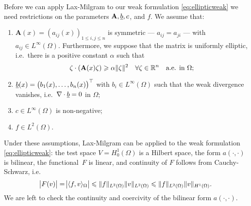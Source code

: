 \documentclass[thesis.tex]{subfiles}
\begin{document}
Before we can apply  Lax-Milgram to our weak formulation \eqref{eq:ellipticweak} we need restrictions on the parameters $\mathbf{A}, \underline{b}, c$, and $f$. We assume that:
\begin{enumerate}[label=(\alph*)]
  \item $\mathbf{A}(x) = (a_{ij}(x))_{1 \leq i,j \leq n}$ is symmetric --- $a_{ij} = a_{ji}$ --- with $a_{ij} \in L^{\infty}(\Omega)$. Furthermore, we suppose that the matrix is uniformly elliptic, i.e.~there is a positive constant $\alpha$ such that 
\[
  \zeta \cdot (\mathbf{A}(x) \zeta) \geqslant \alpha \|\zeta\|^2 \quad \forall \zeta \in \mathbb{R}^n \quad \text{a.e. in } \Omega;
\]
\item $\underline{b}(x) = \left(b_1(x), \dots, b_n(x)\right)^\top$ with $b_i \in L^\infty(\Omega)$ such that the weak divergence vanishes, i.e.~$\nabla \cdot \underline{b} = 0$ in $\Omega$;
\item $c \in L^\infty(\Omega)$ is non-negative;
\item $f  \in L^2(\Omega)$.
\end{enumerate}
Under these assumptions, Lax-Milgram can be applied to the weak formulation \eqref{eq:ellipticweak}: the test space $V = H_0^1(\Omega)$ is
a Hilbert space, the form $a(\cdot, \cdot)$ is bilinear, the functional~$F$ is linear, 
and continuity of $F$ follows from Cauchy-Schwarz, i.e. 
\[
\abs{F(v)} = \abs{\langle f,v \rangle_\Omega} \leqslant \|f\|_{L^2(\Omega)} \|v\|_{L^2(\Omega)} \leqslant \|f\|_{L^2(\Omega)} \|v\|_{H^1(\Omega)}.
\]
We are left to check the continuity and coercivity of the bilinear form $a(\cdot, \cdot)$.
\end{document}
